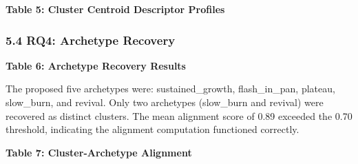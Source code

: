 \textbf{Table 5: Cluster Centroid Descriptor Profiles}

\begin{table}[htbp]
\centering
{}
\end{table}

\subsubsection{5.4 RQ4: Archetype Recovery}

\textbf{Table 6: Archetype Recovery Results}

\begin{table}[htbp]
\centering
{}
\end{table}

The proposed five archetypes were: sustained\_growth, flash\_in\_pan, plateau, slow\_burn, and revival. Only two archetypes (slow\_burn and revival) were recovered as distinct clusters. The mean alignment score of 0.89 exceeded the 0.70 threshold, indicating the alignment computation functioned correctly.

\textbf{Table 7: Cluster-Archetype Alignment}

\begin{table}[htbp]
\centering
{}
\end{table}

